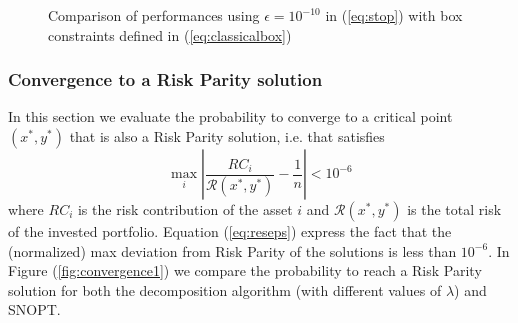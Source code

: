 \begin{figure}
{{
}
}
\caption{Comparison of performances using $\epsilon = 10^{-10}$ in (\ref{eq:stop}) with box constraints defined in (\ref{eq:classicalbox})}
\end{figure}

\subsubsection{Convergence to a Risk Parity solution}
In this section we evaluate the probability to converge to a critical point $(x^*,y^*)$ that is also a Risk Parity solution, i.e. that satisfies 
\begin{equation}\label{eq:reseps}
\max_i \left| \frac{RC_i}{\mathcal{R}(x^*,y^*)} - \frac{1}{n} \right| < 10^{-6}
\end{equation}
where $RC_i$ is the risk contribution of the asset $i$ and ${\mathcal{R}(x^*,y^*)}$ is the total risk of the invested portfolio. Equation (\ref{eq:reseps}) express the fact that the (normalized) max deviation from Risk Parity of the solutions is less than $10^{-6}$. In Figure (\ref{fig:convergence1}) we compare the probability to reach a Risk Parity solution for both the decomposition algorithm (with different values of $\lambda$) and SNOPT. 

